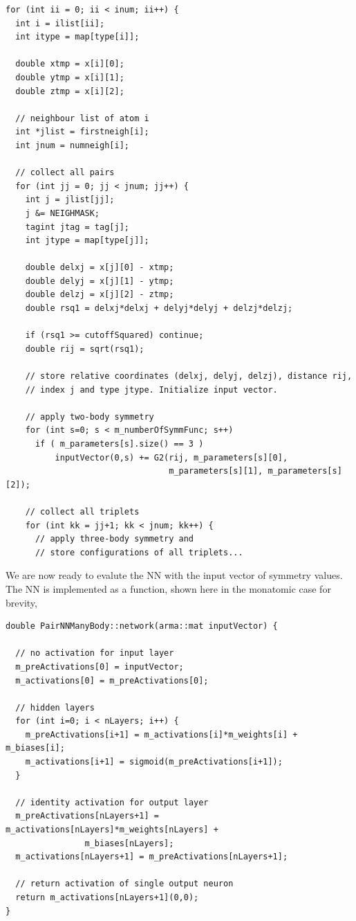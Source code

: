 \documentclass[twoside,english]{uiofysmaster}
\begin{document}
\begin{verbatim}
for (int ii = 0; ii < inum; ii++) {
  int i = ilist[ii];
  int itype = map[type[i]];

  double xtmp = x[i][0];
  double ytmp = x[i][1];
  double ztmp = x[i][2];

  // neighbour list of atom i
  int *jlist = firstneigh[i];
  int jnum = numneigh[i];
  
  // collect all pairs
  for (int jj = 0; jj < jnum; jj++) {
    int j = jlist[jj];
    j &= NEIGHMASK;
    tagint jtag = tag[j];
    int jtype = map[type[j]];

    double delxj = x[j][0] - xtmp;
    double delyj = x[j][1] - ytmp;
    double delzj = x[j][2] - ztmp;
    double rsq1 = delxj*delxj + delyj*delyj + delzj*delzj;

    if (rsq1 >= cutoffSquared) continue;   
    double rij = sqrt(rsq1);
    
    // store relative coordinates (delxj, delyj, delzj), distance rij, 
    // index j and type jtype. Initialize input vector. 
    
    // apply two-body symmetry
    for (int s=0; s < m_numberOfSymmFunc; s++)
      if ( m_parameters[s].size() == 3 )
          inputVector(0,s) += G2(rij, m_parameters[s][0],
                                 m_parameters[s][1], m_parameters[s][2]);
    
    // collect all triplets
    for (int kk = jj+1; kk < jnum; kk++) {
      // apply three-body symmetry and 
      // store configurations of all triplets...
\end{verbatim}
We are now ready to evalute the NN with the input vector of symmetry values. 
The NN is implemented as a function, shown here in the monatomic case for brevity,
\begin{verbatim}
double PairNNManyBody::network(arma::mat inputVector) {

  // no activation for input layer
  m_preActivations[0] = inputVector;
  m_activations[0] = m_preActivations[0];

  // hidden layers
  for (int i=0; i < nLayers; i++) {
    m_preActivations[i+1] = m_activations[i]*m_weights[i] + m_biases[i];
    m_activations[i+1] = sigmoid(m_preActivations[i+1]);
  }

  // identity activation for output layer
  m_preActivations[nLayers+1] = m_activations[nLayers]*m_weights[nLayers] + 
				m_biases[nLayers];
  m_activations[nLayers+1] = m_preActivations[nLayers+1];

  // return activation of single output neuron
  return m_activations[nLayers+1](0,0);
}
\end{verbatim}
\end{document}
